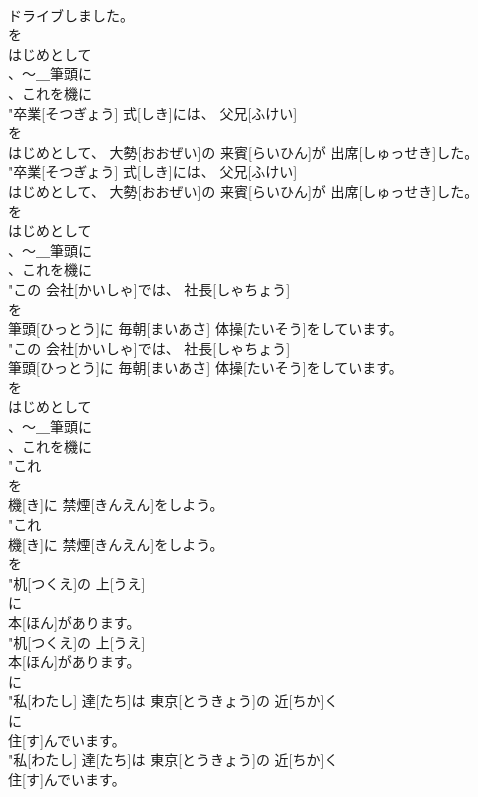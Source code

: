 \documentclass[8pt]{extreport}
\begin{document}
\begin{CJK}{UTF8}{min}
\\	ドライブしました。
\\	を
\\	はじめとして
\\	、～＿筆頭に
\\	、これを機に
\\	"卒業[そつぎょう] 式[しき]には、 父兄[ふけい]
\\	を
\\	はじめとして、 大勢[おおぜい]の 来賓[らいひん]が 出席[しゅっせき]した。
\\	"卒業[そつぎょう] 式[しき]には、 父兄[ふけい]
\\	はじめとして、 大勢[おおぜい]の 来賓[らいひん]が 出席[しゅっせき]した。
\\	を
\\	はじめとして
\\	、～＿筆頭に
\\	、これを機に
\\	"この 会社[かいしゃ]では、 社長[しゃちょう]
\\	を
\\	筆頭[ひっとう]に 毎朝[まいあさ] 体操[たいそう]をしています。
\\	"この 会社[かいしゃ]では、 社長[しゃちょう]
\\	筆頭[ひっとう]に 毎朝[まいあさ] 体操[たいそう]をしています。
\\	を
\\	はじめとして
\\	、～＿筆頭に
\\	、これを機に
\\	"これ
\\	を
\\	機[き]に 禁煙[きんえん]をしよう。
\\	"これ
\\	機[き]に 禁煙[きんえん]をしよう。
\\	を
\\	"机[つくえ]の 上[うえ]
\\	に
\\	本[ほん]があります。
\\	"机[つくえ]の 上[うえ]
\\	本[ほん]があります。
\\	に
\\	"私[わたし] 達[たち]は 東京[とうきょう]の 近[ちか]く
\\	に
\\	住[す]んでいます。
\\	"私[わたし] 達[たち]は 東京[とうきょう]の 近[ちか]く
\\	住[す]んでいます。

\end{CJK}
\end{document}
